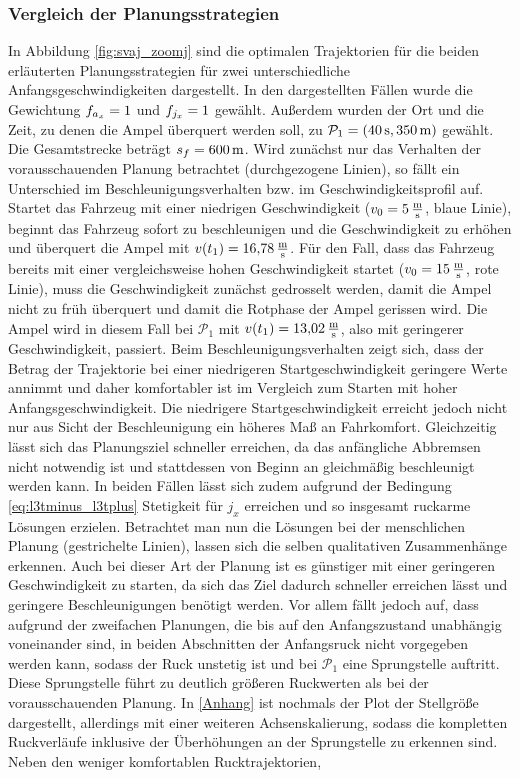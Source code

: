 \subsubsection{Vergleich der Planungsstrategien}\label{subsubsec:Vergleich}
In Abbildung \ref{fig:svaj_zoomj} sind die optimalen Trajektorien für die beiden erläuterten Planungsstrategien für zwei unterschiedliche Anfangsgeschwindigkeiten dargestellt. In den dargestellten Fällen wurde die Gewichtung $f_{a_x} = 1$ und $f_{j_x} = 1$ gewählt. Außerdem wurden der Ort und die Zeit, zu denen die Ampel überquert werden soll, zu $\mathcal{P}_1 = (40\,\mathrm{s}, 350\,\mathrm{m})$ gewählt. Die Gesamtstrecke beträgt $s_f = 600\,\mathrm{m}$. Wird zunächst nur das Verhalten der vorausschauenden Planung betrachtet (durchgezogene Linien), so fällt ein Unterschied im Beschleunigungsverhalten bzw. im Geschwindigkeitsprofil auf. Startet das Fahrzeug mit einer niedrigen Geschwindigkeit ($v_0 = 5\,\mathrm{\frac{\mathrm{m}}{\mathrm{s}}}$, blaue Linie), beginnt das Fahrzeug sofort zu beschleunigen und die Geschwindigkeit zu erhöhen und überquert die Ampel mit $v(t_1) = 16{,}78\,\mathrm{\frac{\mathrm{m}}{\mathrm{s}}}$. Für den Fall, dass das Fahrzeug bereits mit einer vergleichsweise hohen Geschwindigkeit startet ($v_0 = 15\,\mathrm{\frac{\mathrm{m}}{\mathrm{s}}}$, rote Linie), muss die Geschwindigkeit zunächst gedrosselt werden, damit die Ampel nicht zu früh überquert und damit die Rotphase der Ampel gerissen wird. Die Ampel wird in diesem Fall bei $\mathcal{P}_1$ mit $v(t_1) = 13{,}02\,\mathrm{\frac{\mathrm{m}}{\mathrm{s}}}$, also mit geringerer Geschwindigkeit, passiert. Beim Beschleunigungsverhalten zeigt sich, dass der Betrag der Trajektorie bei einer niedrigeren Startgeschwindigkeit geringere Werte annimmt und daher komfortabler ist im Vergleich zum Starten mit hoher Anfangsgeschwindigkeit. Die niedrigere Startgeschwindigkeit erreicht jedoch nicht nur aus Sicht der Beschleunigung ein höheres Maß an Fahrkomfort. Gleichzeitig lässt sich das Planungsziel schneller erreichen, da das anfängliche Abbremsen nicht notwendig ist und stattdessen von Beginn an gleichmäßig beschleunigt werden kann. In beiden Fällen lässt sich zudem aufgrund der Bedingung \eqref{eq:l3tminus_l3tplus} Stetigkeit für $j_x$ erreichen und so insgesamt ruckarme Lösungen erzielen. Betrachtet man nun die Lösungen bei der menschlichen Planung (gestrichelte Linien), lassen sich die selben qualitativen Zusammenhänge erkennen. Auch bei dieser Art der Planung ist es günstiger mit einer geringeren Geschwindigkeit zu starten, da sich das Ziel dadurch schneller erreichen lässt und geringere Beschleunigungen benötigt werden. Vor allem fällt jedoch auf, dass aufgrund der zweifachen Planungen, die bis auf den Anfangszustand unabhängig voneinander sind, in beiden Abschnitten der Anfangsruck nicht vorgegeben werden kann, sodass der Ruck unstetig ist und bei $\mathcal{P}_1$ eine Sprungstelle auftritt. Diese Sprungstelle führt zu deutlich größeren Ruckwerten als bei der vorausschauenden Planung. In \ref{Anhang} ist nochmals der Plot der Stellgröße dargestellt, allerdings mit einer weiteren Achsenskalierung, sodass die kompletten Ruckverläufe inklusive der Überhöhungen an der Sprungstelle zu erkennen sind. Neben den weniger komfortablen Rucktrajektorien, 